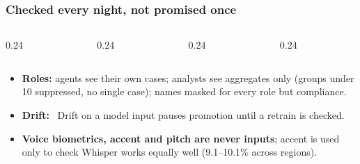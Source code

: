 \documentclass[aspectratio=169,10pt]{beamer}
\begin{document}
\begin{frame}
  \frametitle{Checked every night, not promised once}
  \begin{columns}[T]
    \begin{column}{0.24\textwidth}\end{column}
    \begin{column}{0.24\textwidth}\end{column}
    \begin{column}{0.24\textwidth}\end{column}
    \begin{column}{0.24\textwidth}\end{column}
  \end{columns}
  \vspace{0.8em}
  \begin{itemize}\setlength\itemsep{0.3em}\scriptsize
    \item \textbf{Roles:} agents see their own cases; analysts see aggregates only (groups under 10 suppressed, no single case); names masked for every role but compliance.
    \item \textbf{Drift:} \KdriftHeadline\ Drift on a model input pauses promotion until a retrain is checked.
    \item \textbf{Voice biometrics, accent and pitch are never inputs}; accent is used only to check Whisper works equally well (9.1--10.1\% across regions).
  \end{itemize}
\end{frame}
\end{document}
